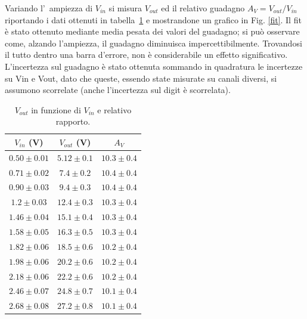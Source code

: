 \documentclass[10pt,a4paper]{article}
\begin{document}
	Variando l'~ampiezza di $V_{in}$ si misura $V_{out}$ ed il relativo guadagno $A_V=V_{out}/V_{in}$ riportando i dati ottenuti in tabella~\ref{tab:guadagno} 
	e mostrandone un grafico in Fig. \ref{fit}. 
	Il fit è stato ottenuto mediante media pesata dei valori del guadagno; si può osservare come, alzando l'ampiezza, il guadagno diminuisca impercettibilmente. Trovandosi il tutto dentro una barra d'errore, non è considerabile un effetto significativo.
	L'incertezza sul guadagno è stato ottenuta sommando in quadratura le incertezze su Vin e Vout, dato che queste, essendo state misurate su canali diversi, si assumono scorrelate (anche l'incertezza sul digit è scorrelata).
	
	\begin{table}[h]
		\caption{$V_{out}$ in funzione di $V_{in}$ e relativo rapporto.}
		\label{tab:guadagno}
		\begin{center}
			\begin{tabular}{|c|c|c|}
				\hline
				$V_{in}$ (V) & $V_{out}$ (V)  & $A_V$ \\
				\hline
				\hline
				$ 0.50\pm 0.01 $ & $5.12 \pm 0.1 $ & $10.3 \pm 0.4 $ \\
				\hline
				$0.71 \pm 0.02 $ & $7.4 \pm 0.2 $ & $10.4 \pm 0.4 $ \\
				\hline
				$0.90 \pm 0.03 $ & $9.4 \pm 0.3 $ & $10.4 \pm 0.4 $ \\
				\hline
				$1.2 \pm 0.03 $ & $12.4 \pm 0.3 $ & $10.3 \pm 0.4 $ \\
				\hline
				$1.46 \pm 0.04 $ & $15.1 \pm 0.4 $ & $10.3 \pm 0.4 $ \\
				\hline
				$1.58 \pm 0.05 $ & $16.3 \pm 0.5 $ & $10.3 \pm 0.4 $ \\
				\hline
				$1.82 \pm 0.06 $ & $18.5 \pm 0.6 $ & $10.2 \pm 0.4 $ \\
				\hline
				$1.98 \pm 0.06 $ & $20.2 \pm 0.6 $ & $10.2 \pm 0.4 $ \\
				\hline
				$2.18 \pm 0.06 $ & $22.2 \pm 0.6 $ & $10.2 \pm 0.4 $ \\
				\hline
				$2.46 \pm 0.07 $ & $24.8 \pm 0.7 $ & $10.1 \pm 0.4 $ \\
				\hline
				$2.68 \pm 0.08 $ & $27.2 \pm 0.8 $ & $10.1 \pm 0.4 $ \\
				\hline
		
			\end{tabular}
		\end{center}
	\end{table}
\end{document}

